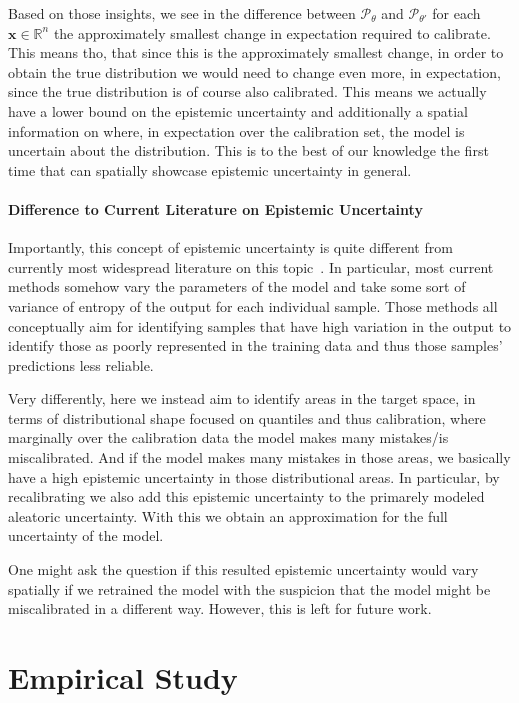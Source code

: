 Based on those insights, we see in the difference between $\mathscr{P}_\theta$ and $\mathscr{P}_{\theta'}$ for each $\mathbf{x}\in\mathbb{R}^n$ the approximately smallest change in expectation required to calibrate. This means tho, that since this is the approximately smallest change, in order to obtain the true distribution we would need to change even more, in expectation, since the true distribution is of course also calibrated. This means we actually have a lower bound on the epistemic uncertainty and additionally a spatial information on where, in expectation over the calibration set, the model is uncertain about the distribution. This is to the best of our knowledge the first time that can spatially showcase epistemic uncertainty in general.

\subsubsection{Difference to Current Literature on Epistemic Uncertainty}

Importantly, this concept of epistemic uncertainty is quite different from currently most widespread literature on this topic~\cite{gal_dropout_2016,hullermeier_aleatoric_2021}. In particular, most current methods somehow vary the parameters of the model and take some sort of variance of entropy of the output for each individual sample. Those methods all conceptually aim for identifying samples that have high variation in the output to identify those as poorly represented in the training data and thus those samples' predictions less reliable.

Very differently, here we instead aim to identify areas in the target space, in terms of distributional shape focused on quantiles and thus calibration, where marginally over the calibration data the model makes many mistakes/is miscalibrated. And if the model makes many mistakes in those areas, we basically have a high epistemic uncertainty in those distributional areas. In particular, by recalibrating we also add this epistemic uncertainty to the primarely modeled aleatoric uncertainty. With this we obtain an approximation for the full uncertainty of the model.

One might ask the question if this resulted epistemic uncertainty would vary spatially if we retrained the model with the suspicion that the model might be miscalibrated in a different way. However, this is left for future work.

\chapter{Empirical Study}\label{chap:empirical_study}

